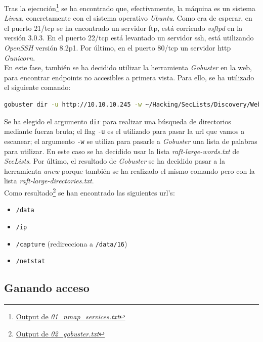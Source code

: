 Tras la ejecución\footnote{\href{https://github.com/VictorNS69/TFM/blob/main/machines/cap/01_nmap_services.txt}{Output de \textit{01\_nmap\_services.txt}}} se ha encontrado que, efectivamente, la máquina es un sistema \textit{Linux}, concretamente con el sistema operativo \textit{Ubuntu}. Como era de esperar, en el puerto 21/\acrshort{tcp} se ha encontrado un servidor \acrshort{ftp}, está corriendo \textit{vsftpd}\cite{vsftpd} en la versión 3.0.3. En el puerto 22/\acrshort{tcp} está levantado un servidor \acrshort{ssh}, está utilizando \textit{OpenSSH}\cite{openssh} versión 8.2p1. Por último, en el puerto 80/\acrshort{tcp} un servidor \acrshort{http} \textit{Gunicorn}\cite{gunicorn}.\\

En este fase, también se ha decidido utilizar la herramienta \textit{Gobuster}\cite{gobuster} en la web, para encontrar endpoints no accesibles a primera vista. Para ello, se ha utilizado el siguiente comando:
\begin{lstlisting}[language=bash]
gobuster dir -u http://10.10.10.245 -w ~/Hacking/SecLists/Discovery/Web-Content/raft-large-words.txt | anew 03_gobuster.txt
\end{lstlisting}
Se ha elegido el argumento \texttt{dir} para realizar una búsqueda de directorios mediante fuerza bruta; el flag \texttt{-u} es el utilizado para pasar la \acrshort{url} que vamos  a escanear; el argumento \texttt{-w} se utiliza para pasarle a \textit{Gobuster} una lista de palabras para utilizar. En este caso se ha decidido usar la lista \textit{raft-large-words.txt} de \textit{SecLists}\cite{seclists}. Por último, el resultado de \textit{Gobuster} se ha decidido pasar a la herramienta \textit{anew}\cite{anew} porque también se ha realizado el mismo comando pero con la lista \textit{raft-large-directories.txt}.\\

Como resultado\footnote{\href{https://github.com/VictorNS69/TFM/blob/main/machines/cap/02_gobuster.txt}{Output de \textit{02\_gobuster.txt}}} se han encontrado las siguientes \acrshort{url}'s:
\begin{itemize}
    \item \texttt{/data}
    \item \texttt{/ip}
    \item \texttt{/capture} (redirecciona a \texttt{/data/16})
    \item \texttt{/netstat}
\end{itemize}

\subsection{Ganando acceso}

